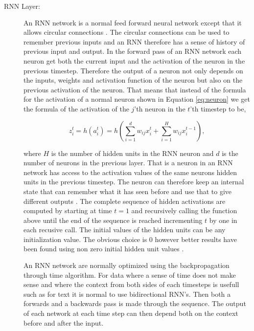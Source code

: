 \begin{description}

    \item[\gls{RNN} Layer:] An RNN network is a normal feed forward neural
        network except that it allows circular connections
        \cite{DBLP:series/sci/2012-385}. The circular connections can be used to
        remember previous inputs and an RNN therefore has a sense of history of
        previous input and output. In the forward pass of an \gls{RNN} network
        each neuron get both the current input and the activation of the neuron
        in the previous timestep. Therefore the output of a neuron not only
        depends on the inputs, weights and activation function of the neuron but
        also on the previous activation of the neuron. That means that instead
        of the formula for the activation of a normal neuron shown in Equation
        \ref{eq:neuron} we get the formula of the activation of the $j$'th
        neuron in the $t$'th timestep to be,

        \begin{equation}
            z_i^t = h(a_i^t) = h \left(
                \sum_{i=1}^d w_{ij} x_i^t + \sum_{i=1}^H w_{ij} x_i^{t-1}
            \right),
        \end{equation}

        where $H$ is the number of hidden units in the RNN neuron and $d$ is
        the number of neurons in the previous layer. That is a neuron in an
        \gls{RNN} network has access to the activation values of the same
        neurons hidden units in the previous timestep. The neuron can therefore
        keep an internal state that can remember what it has seen before and
        use that to give different outputs \cite{DBLP:series/sci/2012-385}. The
        complete sequence of hidden activations are computed by starting at time
        $t=1$ and recursively calling the function above until the end of the
        sequence is reached incrementing $t$ by one in each recusive call. The
        initial values of the hidden units can be any initialization value. The
        obvious choice is 0 however better results have been found using non
        zero initial hidden unit values \cite{DBLP:series/sci/2012-385}.

        An \gls{RNN} network are normally optimized using the backpropagation
        through time algorithm. For data where a sense of time does not make
        sense and where the context from both sides of each timesteps is usefull
        such as for text it is normal to use bidirectional \gls{RNN}'s. Then
        both a forwards and a backwards pass is made through the sequence. The
        output of each network at each time step can then depend both on the
        context before and after the input.


\end{description}
